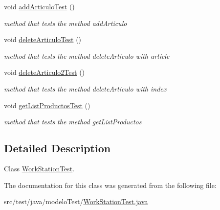 \begin{DoxyCompactItemize}
void \mbox{\hyperlink{classmodelo_test_1_1_work_station_test_a5dd6aa55ae1ade521d71169e2db70e0d}{add\+Articulo\+Test}} ()
\begin{DoxyCompactList}\small\item\em method that tests the method add\+Articulo \end{DoxyCompactList}\item 
\mbox{\label{classmodelo_test_1_1_work_station_test_a71fc00cd350eee574aba275f879db67a}} 
void \mbox{\hyperlink{classmodelo_test_1_1_work_station_test_a71fc00cd350eee574aba275f879db67a}{delete\+Articulo\+Test}} ()
\begin{DoxyCompactList}\small\item\em method that tests the method delete\+Articulo with article \end{DoxyCompactList}\item 
\mbox{\label{classmodelo_test_1_1_work_station_test_a2c22d2b6ea19b1d295e00f22dcd0d63c}} 
void \mbox{\hyperlink{classmodelo_test_1_1_work_station_test_a2c22d2b6ea19b1d295e00f22dcd0d63c}{delete\+Articulo2\+Test}} ()
\begin{DoxyCompactList}\small\item\em method that tests the method delete\+Articulo with index \end{DoxyCompactList}\item 
\mbox{\label{classmodelo_test_1_1_work_station_test_ab58c6a8072c2314a52813d470f4f4721}} 
void \mbox{\hyperlink{classmodelo_test_1_1_work_station_test_ab58c6a8072c2314a52813d470f4f4721}{get\+List\+Productos\+Test}} ()
\begin{DoxyCompactList}\small\item\em method that tests the method get\+List\+Productos \end{DoxyCompactList}\end{DoxyCompactItemize}


\subsection{Detailed Description}
Class \mbox{\hyperlink{classmodelo_test_1_1_work_station_test}{Work\+Station\+Test}}. 

The documentation for this class was generated from the following file\+:\begin{DoxyCompactItemize}
\item 
src/test/java/modelo\+Test/\mbox{\hyperlink{_work_station_test_8java}{Work\+Station\+Test.\+java}}\end{DoxyCompactItemize}

